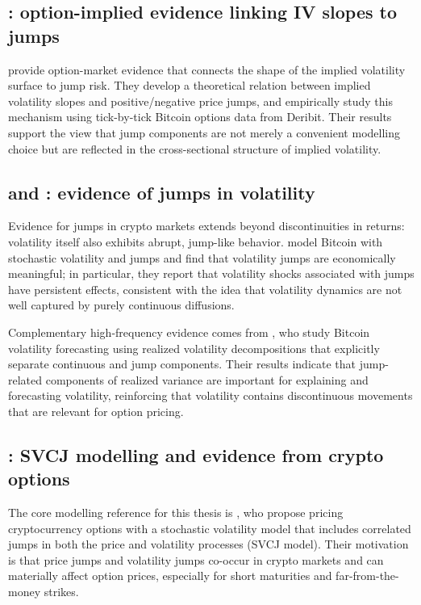 \documentclass[a4paper,titlepage,12pt]{report}
\theoremstyle{plain}
\begin{document}
\subsection{\citet{ChenDengNie2024}: option-implied evidence linking IV slopes to jumps}\label{subsec:chen_iv_slopes}

\citet{ChenDengNie2024} provide option-market evidence that connects the shape of the implied
volatility surface to jump risk. They develop a theoretical relation between implied volatility
slopes and positive/negative price jumps, and empirically study this mechanism using tick-by-tick
Bitcoin options data from Deribit. Their results support the view that jump components are not merely
a convenient modelling choice but are reflected in the cross-sectional structure of implied
volatility.

\subsection{\citet{ChaimLaurini2018} and \citet{ShenUrquhartWang2020}: evidence of jumps in volatility}
\label{subsec:vol_jumps_crypto}

Evidence for jumps in crypto markets extends beyond discontinuities in returns: volatility itself also exhibits abrupt, jump-like behavior. \citet{ChaimLaurini2018} model Bitcoin with stochastic volatility and jumps and find that volatility jumps are economically meaningful; in particular, they report that volatility shocks associated with jumps have persistent effects, consistent with the idea that volatility dynamics are not well captured by purely continuous diffusions.

Complementary high-frequency evidence comes from \citet{ShenUrquhartWang2020}, who study Bitcoin volatility forecasting using realized volatility decompositions that explicitly separate continuous and jump components. Their results indicate that jump-related components of realized variance are important for explaining and forecasting volatility, reinforcing that volatility contains discontinuous movements that are relevant for option pricing.

\subsection{\citet{HouEtAl2020}: SVCJ modelling and evidence from crypto options}\label{subsec:hou_svcj}

The core modelling reference for this thesis is \citet{HouEtAl2020}, who propose pricing
cryptocurrency options with a stochastic volatility model that includes correlated jumps in both the price and volatility processes (SVCJ model). Their motivation is that price jumps and volatility jumps co-occur in crypto markets and can materially affect option prices, especially for short
maturities and far-from-the-money strikes.
\end{document}
